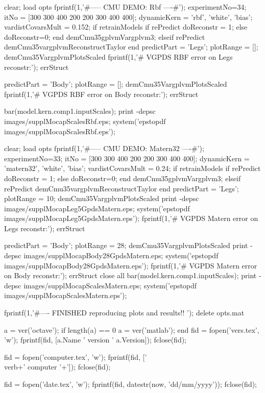 \documentclass{article} %
\newenvironment{matlab}{\comment}{\endcomment}
\begin{document}
\begin{matlab}

clear; load opts
fprintf(1,'\n\n#-----  CMU DEMO: Rbf ----#\n');
experimentNo=34; 
itNo = [300 300 400 200 200 300 400 400];
dynamicKern = {'rbf', 'white', 'bias'};
vardistCovarsMult = 0.152;
if retrainModels 
    if rePredict
        doReconstr = 1;
    else
        doReconstr=0;
    end
    demCmu35gplvmVargplvm3;
elseif rePredict
    demCmu35vargplvmReconstructTaylor
end
predictPart = 'Legs';  plotRange = [];
demCmu35VargplvmPlotsScaled
fprintf(1,'# VGPDS RBF error on Legs reconstr:');
errStruct

predictPart = 'Body';  plotRange = [];
demCmu35VargplvmPlotsScaled
fprintf(1,'# VGPDS RBF error on Body reconstr:');
errStruct

bar(model.kern.comp{1}.inputScales);
print -depsc images/supplMocapScalesRbf.eps; system('epstopdf images/supplMocapScalesRbf.eps');


clear; load opts
fprintf(1,'\n\n#-----  CMU DEMO: Matern32 ----#\n');
experimentNo=33; 
itNo = [300 300 400 200 200 300 400 400];
dynamicKern = {'matern32', 'white', 'bias'};
vardistCovarsMult = 0.24;
if retrainModels 
    if rePredict
        doReconstr = 1;
    else
        doReconstr=0;
    end
    demCmu35gplvmVargplvm3;
elseif rePredict
    demCmu35vargplvmReconstructTaylor
end
predictPart = 'Legs'; plotRange = 10;
demCmu35VargplvmPlotsScaled
print -depsc images/supplMocapLeg5GpdsMatern.eps; system('epstopdf images/supplMocapLeg5GpdsMatern.eps');
fprintf(1,'# VGPDS Matern error on Legs reconstr:');
errStruct

predictPart = 'Body'; plotRange = 28;
demCmu35VargplvmPlotsScaled
print -depsc images/supplMocapBody28GpdsMatern.eps; system('epstopdf images/supplMocapBody28GpdsMatern.eps');
fprintf(1,'# VGPDS Matern error on Body reconstr:');
errStruct
close all
bar(model.kern.comp{1}.inputScales);
print -depsc images/supplMocapScalesMatern.eps; system('epstopdf images/supplMocapScalesMatern.eps');


fprintf(1,'\n\n#---- FINISHED reproducing plots and results!! \n');
delete opts.mat


a = ver('octave');
if length(a) == 0
  a = ver('matlab');
end
fid = fopen('vers.tex', 'w');
fprintf(fid, [a.Name ' version ' a.Version]);
fclose(fid);

fid = fopen('computer.tex', 'w');
fprintf(fid, ['\\verb+' computer '+']);
fclose(fid);

fid = fopen('date.tex', 'w');
fprintf(fid, datestr(now, 'dd/mm/yyyy'));
fclose(fid);

\end{matlab}
\end{document}
